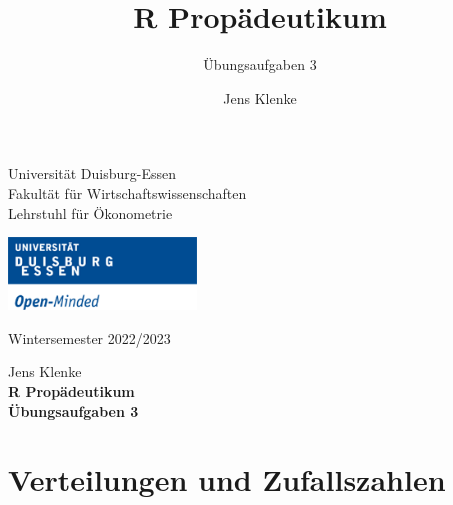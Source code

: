 \documentclass[12pt,a4paper]{article}
\title{R Propädeutikum}
\subtitle{Übungsaufgaben 3}
\author{Jens Klenke}
\date{}
\begin{document}





\restoregeometry



\begin{minipage}{0.6\textwidth}
Universität Duisburg-Essen\\
Fakultät für Wirtschaftswissenschaften\\
Lehrstuhl für Ökonometrie\\
\end{minipage}

	\begin{flushright}
	\vspace{-3cm}
	\includegraphics*[width=5cm]{includes/duelogo_en.png}\\
	\vspace{.125cm}
	\end{flushright}
\hspace{-0.005cm}Wintersemester 2022/2023

\vspace{0.05cm}

\begin{center}
	\vspace{.25cm}
	Jens Klenke \hspace{.5cm}  \\
	\vspace{.25cm}
	\textbf{\Large{R Propädeutikum}}\\
	\vspace{.25cm}
	\textbf{\large{Übungsaufgaben 3}}\\
	\vspace{.125cm}
\end{center}





\hypertarget{verteilungen-und-zufallszahlen}{%
\section{Verteilungen und
Zufallszahlen}\label{verteilungen-und-zufallszahlen}}
\end{document}
